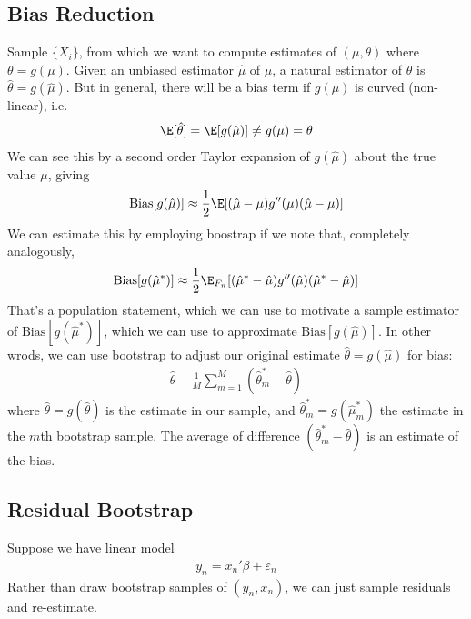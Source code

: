\documentclass[12pt]{article}
\theoremstyle{plain}
\theoremstyle{definition}
\theoremstyle{remark}
\begin{document}
\clearpage
\subsection{Bias Reduction}

Sample $\{X_i\}$, from which we want to compute estimates of
$(\mu,\theta)$ where $\theta=g(\mu)$.
Given an unbiased estimator $\hat{\mu}$ of $\mu$, a natural estimator of
$\theta$ is $\hat{\theta}=g(\hat{\mu})$.
But in general, there will be a bias term if $g(\mu)$ is curved
(non-linear), i.e.
\begin{align*}
  \E[\hat{\theta}]=\E[g(\hat{\mu})] \neq g(\mu)
  = \theta
\end{align*}
We can see this by a second order Taylor expansion of $g(\hat{\mu})$
about the true value $\mu$, giving
\begin{align*}
  \text{Bias}[g(\hat{\mu})]
  \approx
  \frac{1}{2}
  \E[(\hat{\mu}-\mu)g''(\mu)(\hat{\mu}-\mu)]
\end{align*}
We can estimate this by employing boostrap if we note that, completely
analogously,
\begin{align*}
  \text{Bias}[g(\hat{\mu}^*)]
  \approx
  \frac{1}{2}
  \E_{F_n}[(\hat{\mu}^*-\hat{\mu})g''(\hat{\mu})(\hat{\mu}^*-\hat{\mu})]
\end{align*}
That's a population statement, which we can use to motivate a sample
estimator of $\text{Bias}[g(\hat{\mu}^*)]$, which we can use to
approximate $\text{Bias}[g(\hat{\mu})]$.
In other wrods, we can use bootstrap to adjust our original estimate
$\hat{\theta}=g(\hat{\mu})$ for bias:
\begin{align*}
  \hat{\theta}
  -
  \frac{1}{M}\sum_{m=1}^M
  (\hat{\theta}_m^*-\hat{\theta})
\end{align*}
where $\hat{\theta}=g(\hat{\theta})$ is the estimate in our sample, and
$\hat{\theta}_m^*=g(\hat{\mu}_m^*)$ the estimate in the $m$th bootstrap
sample.  The average of difference $(\hat{\theta}_m^*-\hat{\theta})$ is
an estimate of the bias.





\clearpage
\subsection{Residual Bootstrap}

Suppose we have linear model
\begin{align*}
  y_n = x_n'\beta + \varepsilon_n
\end{align*}
Rather than draw bootstrap samples of $(y_n,x_n)$, we can just sample
residuals and re-estimate.
\end{document}
